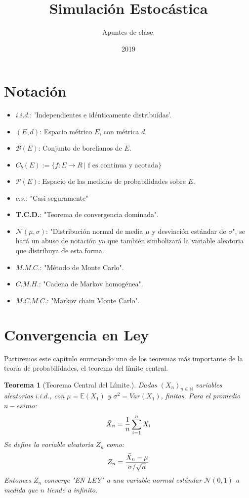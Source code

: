 \documentclass[a4paper]{article}
\title{Simulación Estocástica}
\author{Apuntes de clase.}
\date{2019}
\newtheorem{teorema}{Teorema}
\numberwithin{equation}{subsection}
\def\N{\mathbb N}
\def\E{\mathbb E}
\begin{document}
\maketitle
\tableofcontents
\newpage
\section{Notación}
\begin{itemize}
    \item $i.i.d.$: 'Independientes e idénticamente distribuídas'.
    \item $(E,d)$: Espacio métrico $E$, con métrica $d$.
    \item $\mathcal{B}(E)$: Conjunto de borelianos de $E$.
    \item $C_b (E) := \{f:E \rightarrow R \,| \text{ f es contínua y acotada}\}$
    \item $\mathcal{P}(E)$: Espacio de las medidas de probabilidades sobre $E$.
    \item $c.s.$: "Casi seguramente"
    \item \textbf{T.C.D.}: "Teorema de convergencia  dominada".
    \item $\mathcal{N}(\mu,\sigma)$: "Distribución normal de media $\mu$ y desviación estándar de $\sigma$", se hará un abuso de notación ya que también simbolizará la variable aleatoria que distribuya de esta forma.
    \item $M.M.C.$: "Método de Monte Carlo".
    \item $C.M.H.$: "Cadena de Markov homogénea".
    \item $M.C.M.C.$: "Markov chain Monte Carlo".
\end{itemize}

\section{Convergencia en Ley}
Partiremos este capítulo enunciando uno de los teoremas más importante de la teoría de probabilidades, el teorema del límite central.

\begin{teorema}[Teorema Central del Límite.] Dadas $(X_n)_{n\in\N}$ variables aleatorias $i.i.d.$, con \newline$\mu = \E(X_1)$ y $\sigma^2 = Var(X_1)$, finitas. Para el promedio $n-esimo$:
\begin{equation}
    \Bar{X}_n = \frac{1}{n}\sum_{i=1}^{n}X_i
\end{equation}
Se define la variable aleatoria $Z_n$ como:
\begin{equation}
    Z_n = \frac{\Bar{X}_n - \mu}{\sigma / \sqrt{n}}
\end{equation}
Entonces $Z_n$ converge "EN LEY" a una variable normal estándar $\mathcal{N}(0,1)$ a medida que $n$ tiende a infinito.
\end{teorema}
\end{document}
